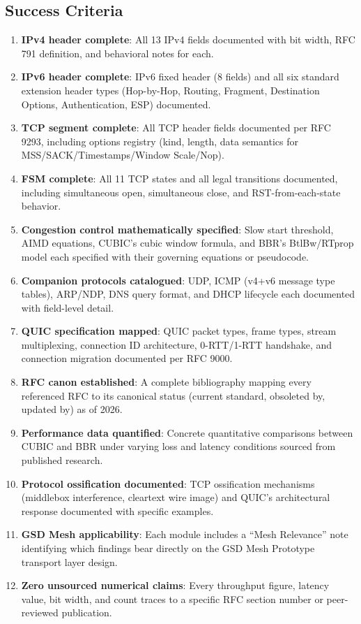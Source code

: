 \documentclass[11pt,letterpaper]{article}
\begin{document}
\subsection{Success Criteria}

\begin{enumerate}
  \item \textbf{IPv4 header complete}: All 13 IPv4 fields documented with bit width, RFC 791 definition, and behavioral notes for each.
  \item \textbf{IPv6 header complete}: IPv6 fixed header (8 fields) and all six standard extension header types (Hop-by-Hop, Routing, Fragment, Destination Options, Authentication, ESP) documented.
  \item \textbf{TCP segment complete}: All TCP header fields documented per RFC 9293, including options registry (kind, length, data semantics for MSS/SACK/Timestamps/Window Scale/Nop).
  \item \textbf{FSM complete}: All 11 TCP states and all legal transitions documented, including simultaneous open, simultaneous close, and RST-from-each-state behavior.
  \item \textbf{Congestion control mathematically specified}: Slow start threshold, AIMD equations, CUBIC's cubic window formula, and BBR's BtlBw/RTprop model each specified with their governing equations or pseudocode.
  \item \textbf{Companion protocols catalogued}: UDP, ICMP (v4+v6 message type tables), ARP/NDP, DNS query format, and DHCP lifecycle each documented with field-level detail.
  \item \textbf{QUIC specification mapped}: QUIC packet types, frame types, stream multiplexing, connection ID architecture, 0-RTT/1-RTT handshake, and connection migration documented per RFC 9000.
  \item \textbf{RFC canon established}: A complete bibliography mapping every referenced RFC to its canonical status (current standard, obsoleted by, updated by) as of 2026.
  \item \textbf{Performance data quantified}: Concrete quantitative comparisons between CUBIC and BBR under varying loss and latency conditions sourced from published research.
  \item \textbf{Protocol ossification documented}: TCP ossification mechanisms (middlebox interference, cleartext wire image) and QUIC's architectural response documented with specific examples.
  \item \textbf{GSD Mesh applicability}: Each module includes a ``Mesh Relevance'' note identifying which findings bear directly on the GSD Mesh Prototype transport layer design.
  \item \textbf{Zero unsourced numerical claims}: Every throughput figure, latency value, bit width, and count traces to a specific RFC section number or peer-reviewed publication.
\end{enumerate}
\end{document}
